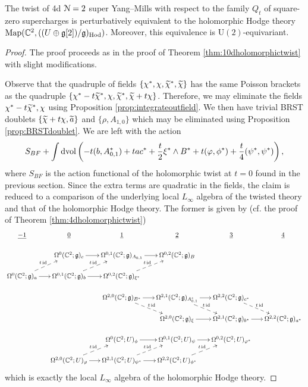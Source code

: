 \documentclass[10pt, oneside]{article}
\renewcommand{\U}{\mathrm{U}}
\begin{document}
\begin{theorem}
The twist of 4d $\mathcal N=2$ super Yang--Mills with respect to the family $Q_t$ of square-zero supercharges is perturbatively equivalent to the holomorphic Hodge theory $\operatorname{Map}(\mathbb C^2, ((U\oplus \mathfrak g[2]) / \mathfrak g)_{\mathrm{Hod}})$. Moreover, this equivalence is $\U(2)$-equivariant.
\label{thm:4dDonaldsontwist}
\end{theorem}
\begin{proof}
The proof proceeds as in the proof of Theorem \ref{thm:10dholomorphictwist} with slight modifications.

Observe that the quadruple of fields $\{\chi^*, \chi, \widetilde{\chi}^*, \widetilde{\chi}\}$ has the same Poisson brackets as the quadruple $\{\chi^*-t\widetilde{\chi}^*, \chi, \widetilde{\chi}^*, \widetilde{\chi} + t\chi\}$. Therefore, we may eliminate the fields $\chi^*-t\widetilde{\chi}^*, \chi$ using Proposition \ref{prop:integrateoutfield}. We then have trivial BRST doublets $\{\widetilde{\chi} + t\chi, \widetilde{a}\}$ and $\{\rho, A_{1, 0}\}$ which may be eliminated using Proposition \ref{prop:BRSTdoublet}. We are left with the action
\[S_{BF} + \int\operatorname{dvol}\left(-t(b, A_{0, 1}^*) + t a c^* + \frac{t}{2} \xi^*\wedge B^* + t (\varphi, \phi^*) + \frac t4 (\psi^*, \psi^*) \right),\]
where $S_{BF}$ is the action functional of the holomorphic twist at $t=0$ found in the previous section. 
Since the extra terms are quadratic in the fields, the claim is reduced to a comparison of the underlying local $L_\infty$ algebra of the twisted theory and that of the holomorphic Hodge theory. The former is given by (cf. the proof of Theorem \ref{thm:4dholomorphictwist})
\[
\xymatrix@R=0.5cm@C=0.5cm{
\ul{-1} & \ul{0} & \ul{1} & \ul{2} & \ul{3} & \ul{4} \\ 
& \Omega^0(\CC^2; \gg)_c \ar[r] &\Omega^{0,1}(\CC^2; \gg)_{A_{0,1}} \ar[r] &\Omega^{0,2}(\CC^2; \gg)_{B} \\
\Omega^0(\CC^2; \gg)_a  \ar@{-->}^{t\id}[ur] \ar[r] &\Omega^{0,1}(\CC^2; \gg)_{b}  \ar@{-->}^{t\id}[ur] \ar[r] &\Omega^{0,2}(\CC^2; \gg)_{\xi^*}  \ar@{-->}^{t\id}[ur] \\
& &  \Omega^{2,0}(\CC^2 ; \gg)_{B^*}  \ar@{-->}^{t\id}[dr] \ar[r] & \Omega^{2,1}(\CC^2 ; \gg)_{A_{0,1}^*} \ar[r]  \ar@{-->}^{t\id}[dr] & \Omega^{2,2}(\CC^2 ; \gg)_{c^*}  \ar@{-->}^{t\id}[dr] \\
& & & \Omega^{2,0}(\CC^2; \gg)_\xi \ar[r] &\Omega^{2,1}(\CC^2; \gg)_{b^*} \ar[r] &\Omega^{2,2}(\CC^2; \gg)_{a^*}  \\
& & \Omega^0(\CC^2 ; U)_\phi \ar[r] & \Omega^{0,1}(\CC^2 ; U)_\psi \ar[r] & \Omega^{0,2}(\CC^2 ; U)_{\varphi^*} \\
& \Omega^{2,0}(\CC^2 ; U)_{\varphi} \ar[r]  \ar@{-->}^{t\id}[ur] & \Omega^{2,1}(\CC^2 ; U)_{\psi^*} \ar[r]  \ar@{-->}^{t\id}[ur]  & \Omega^{2,2}(\CC^2 ; U)_{\phi^*}  \ar@{-->}^{t\id}[ur]
}
\]
which is exactly the local $L_\infty$ algebra of the holomorphic Hodge theory.
\end{proof}
\end{document}
